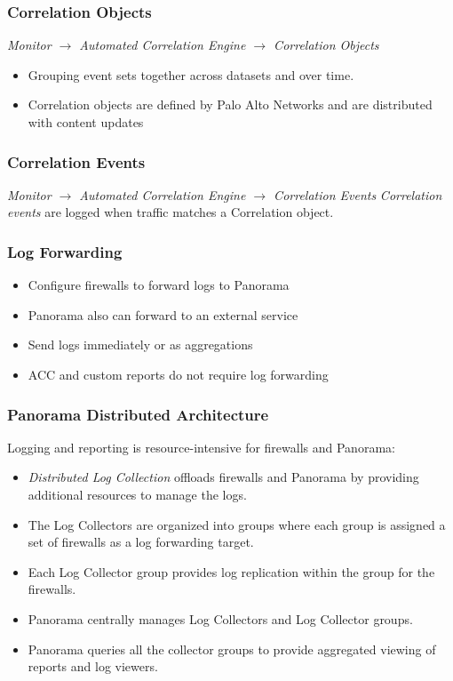 \subsubsection{Correlation Objects}
\textit{Monitor $\rightarrow$ Automated Correlation Engine $\rightarrow$ Correlation Objects}
\newline
\begin{itemize}
    \item Grouping event sets together across datasets and over time.
    \item Correlation objects are defined by Palo Alto Networks and are distributed with content updates
\end{itemize}

\subsubsection{Correlation Events}
\textit{Monitor $\rightarrow$ Automated Correlation Engine $\rightarrow$ Correlation Events}
\newline
\textit{Correlation events} are logged when traffic matches a Correlation object.

\subsubsection{Log Forwarding}
\begin{itemize}
    \item Configure firewalls to forward logs to Panorama
    \item Panorama also can forward to an external service
    \item Send logs immediately or as aggregations
    \item ACC and custom reports do not require log forwarding
\end{itemize}

\subsubsection{Panorama Distributed Architecture}
Logging and reporting is resource-intensive for firewalls and Panorama:
\begin{itemize}
    \item \textit{Distributed Log Collection} offloads firewalls and Panorama by providing additional resources to manage the logs.
    \item The Log Collectors are organized into groups where each group is assigned a set of firewalls as a log forwarding target.
    \item Each Log Collector group provides log replication within the group for the firewalls.
    \item Panorama centrally manages Log Collectors and Log Collector groups.
    \item Panorama queries all the collector groups to provide aggregated viewing of reports and log viewers.
\end{itemize}

